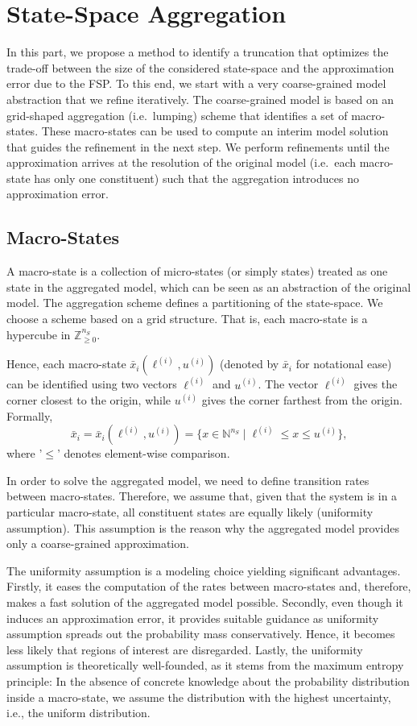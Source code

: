 \chapter{State-Space Aggregation}\label{ch:lumping}
In this part, we propose a  method to identify a truncation that optimizes the trade-off between the size of the considered state-space and the approximation error due to the \acf{FSP}.
To this end, we start with a very coarse-grained model abstraction that we refine iteratively. 
The coarse-grained model is based on an grid-shaped aggregation (i.e.\ lumping) scheme that identifies a set of macro-states.
These macro-states can be used to compute an interim model solution that guides the refinement in the next step.
We perform refinements until the approximation arrives at the resolution of the original model (i.e.\ each macro-state has only one constituent) such that the aggregation introduces no approximation error.

\section{Macro-States}
A macro-state is a collection of micro-states (or simply states) treated as one state in the aggregated model, which can be seen as an abstraction of the original model.
The aggregation scheme defines a partitioning of the state-space.
We choose a scheme based on a grid structure. That is, each macro-state is a hypercube in $\mathbb{Z}_{\geq 0}^{n_S}$.

Hence, each macro-state $\bar{x}_i(\ell^{(i)},u^{(i)})$ (denoted by $\bar{x}_i$ for notational ease) can be identified using two vectors $\ell^{(i)}$
and $u^{(i)}$.
The vector $\ell^{(i)}$ gives the corner closest to the origin, while $u^{(i)}$
gives the corner farthest from the origin.
Formally,
\begin{equation}\label{eq:macro_state}
    \bar{x}_i = \bar{x}_i(\ell^{(i)},u^{(i)}) =  \{x\in\mathbb{N}^{n_S} \mid  \ell^{(i)}  \leq x  \leq u^{(i)} \},
\end{equation}
where '$\leq$' denotes element-wise comparison.

In order to solve the aggregated model, we need to define transition rates between macro-states.
Therefore, we assume that, given that the system is in a particular macro-state, all constituent states are equally likely (uniformity assumption).
This assumption is the reason why the aggregated model provides only a coarse-grained approximation. 

The uniformity assumption is a modeling choice yielding significant advantages.
Firstly, it eases the computation of the rates between macro-states and, therefore, makes a fast solution of the aggregated model possible.
Secondly, even though it induces an approximation error, it provides suitable guidance as uniformity assumption spreads out the probability mass conservatively.
Hence, it becomes less likely that regions of interest are disregarded.
Lastly, the uniformity assumption is theoretically well-founded, as it stems from the maximum entropy principle: 
In the absence of concrete knowledge about the probability distribution inside a macro-state, we assume the distribution with the highest uncertainty, i.e., the uniform distribution. 

